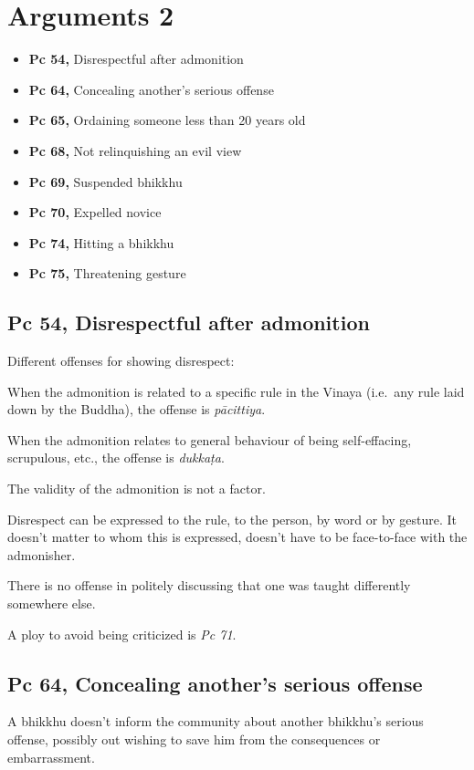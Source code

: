 \chapter{Arguments 2}

\begin{itemize}
\tightlist
\item
  \textbf{Pc 54,} Disrespectful after admonition
\item
  \textbf{Pc 64,} Concealing another's serious offense
\item
  \textbf{Pc 65,} Ordaining someone less than 20 years old
\item
  \textbf{Pc 68,} Not relinquishing an evil view
\item
  \textbf{Pc 69,} Suspended bhikkhu
\item
  \textbf{Pc 70,} Expelled novice
\item
  \textbf{Pc 74,} Hitting a bhikkhu
\item
  \textbf{Pc 75,} Threatening gesture
\end{itemize}

\section{Pc 54, Disrespectful after admonition}

Different offenses for showing disrespect:

When the admonition is related to a specific rule in the Vinaya
(i.e.~any rule laid down by the Buddha), the offense is
\emph{pācittiya}.

When the admonition relates to general behaviour of being self-effacing,
scrupulous, etc., the offense is \emph{dukkaṭa}.

The validity of the admonition is not a factor.

Disrespect can be expressed to the rule, to the person, by word or by
gesture. It doesn't matter to whom this is expressed, doesn't have to be
face-to-face with the admonisher.

There is no offense in politely discussing that one was taught
differently somewhere else.

A ploy to avoid being criticized is \emph{Pc 71}.

\section{Pc 64, Concealing another's serious offense}

A bhikkhu doesn't inform the community about another bhikkhu's serious
offense, possibly out wishing to save him from the consequences or
embarrassment.

